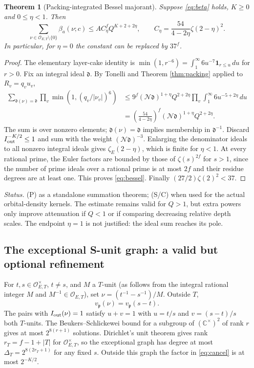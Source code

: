 \documentclass[11pt,a4paper]{article}
\newtheorem{theorem}{Theorem}[section]\newtheorem{proposition}[theorem]{Proposition}\newtheorem{lemma}[theorem]{Lemma}\newtheorem{corollary}[theorem]{Corollary}\theoremstyle{definition}\newtheorem{definition}[theorem]{Definition}\newtheorem{remark}[theorem]{Remark}\newtheorem{obligation}[theorem]{Obligation}
\newcommand{\N}{\mathcal N}\newcommand{\OO}{\mathcal O}\newcommand{\KK}{\mathscr K}\newcommand{\Tr}{\operatorname{tr}}\newcommand{\rk}{\operatorname{rank}}\newcommand{\len}{\operatorname{length}}\newcommand{\diag}{\operatorname{diag}}\newcommand{\vol}{\operatorname{vol}}\newcommand{\Id}{\mathrm I}\newcommand{\vG}{v_{\mathrm G}}\newcommand{\supp}{\operatorname{supp}}\newcommand{\status}[1]{\par\smallskip\noindent\textit{Status.} #1\par\smallskip}
\begin{document}
\begin{theorem}[Packing-integrated Bessel majorant]\label{thm:bessel}
Suppose \eqref{eq:beta} holds, $K\geq0$ and $0\leq\eta<1$. Then
\begin{equation}\label{eq:bessel}
\sum_{\nu\in\OO_{E,T}\setminus\{0\}}\beta_a(\nu;c)\leq A C_\eta^f Q^{K+2+2\eta},\qquad C_\eta=\frac{54}{4-2\eta}\zeta(2-\eta)^2.
\end{equation}
In particular, for $\eta=0$ the constant can be replaced by $37^f$.
\end{theorem}
\begin{proof}
The elementary layer-cake identity is $\min(1,r^{-6})=\int_1^\infty 6u^{-7}\mathbf1_{r\leq u}\,du$ for $r>0$. Fix an integral ideal $\mathfrak d$. By Tonelli and Theorem \ref{thm:packing} applied to $R_v=q_vu_v$,
\begin{align*}
\sum_{\mathfrak d(\nu)=\mathfrak d}\prod_v\min(1,(q_v/|\nu_v|)^6)
&\leq9^f(\N\mathfrak d)^{1+\eta}Q^{2+2\eta}
\prod_v\int_1^\infty6u^{-5+2\eta}\,du\\
&=\left(\frac{54}{4-2\eta}\right)^f(\N\mathfrak d)^{1+\eta}Q^{2+2\eta}.
\end{align*}
The sum is over nonzero elements; $\mathfrak d(\nu)=\mathfrak d$ implies membership in $\mathfrak d^{-1}$. Discard $I_{\rm out}^{-K/2}\leq1$ and sum with the weight $(\N\mathfrak d)^{-3}$. Enlarging the denominator ideals to all nonzero integral ideals gives $\zeta_E(2-\eta)$, which is finite for $\eta<1$. At every rational prime, the Euler factors are bounded by those of $\zeta(s)^{2f}$ for $s>1$, since the number of prime ideals over a rational prime is at most $2f$ and their residue degrees are at least one. This proves \eqref{eq:bessel}. Finally $(27/2)\zeta(2)^2<37$.
\end{proof}
\status{(P) as a standalone summation theorem; (S/C) when used for the actual orbital-density kernels. The estimate remains valid for $Q>1$, but extra powers only improve attenuation if $Q<1$ or if comparing decreasing relative depth scales. The endpoint $\eta=1$ is not justified: the ideal sum reaches its pole.}

\subsection{The exceptional S-unit graph: a valid but optional refinement}
For $t,s\in\OO_{E,T}^\times$, $t\ne s$, and $M$ a $T$-unit (as follows from the integral rational integer $M$ and $M^{-1}\in\OO_{E,T}$), set $\nu=(t^{-1}-s^{-1})/M$. Outside $T$,
\begin{equation}v_{\mathfrak p}(\nu)=v_{\mathfrak p}(s-t).\end{equation}
The pairs with $I_{\rm out}(\nu)=1$ satisfy $u+v=1$ with $u=t/s$ and $v=(s-t)/s$ both $T$-units. The Beukers--Schlickewei bound \cite{beukers} for a subgroup of $(\mathbb C^\times)^2$ of rank $r$ gives at most $2^{8(r+1)}$ solutions. Dirichlet's unit theorem gives rank $r_T=f-1+|T|$ for $\OO_{E,T}^\times$, so the exceptional graph has degree at most $\Delta_T=2^{8(2r_T+1)}$ for any fixed $s$. Outside this graph the factor in \eqref{eq:cancel} is at most $2^{-K/2}$.
\end{document}

